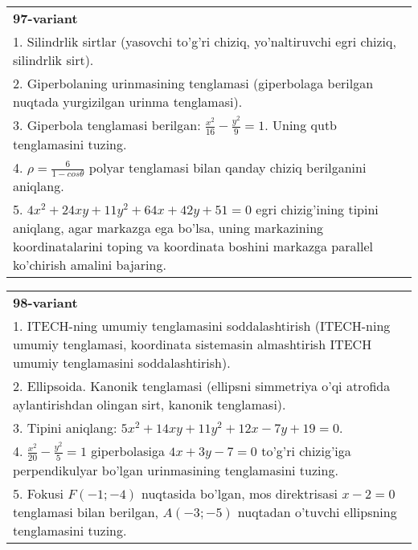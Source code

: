 \documentclass{article}
\begin{document}
\begin{tabular}{m{17cm}}
\textbf{97-variant}\\
1. Silindrlik sirtlar (yasovchi to'g'ri chiziq, yo'naltiruvchi egri chiziq, silindrlik sirt).\\

2. Giperbolaning urinmasining tenglamasi (giperbolaga berilgan nuqtada yurgizilgan urinma tenglamasi).\\

3. Giperbola tenglamasi berilgan: $\frac{x^{2}}{16}-\frac{y^{2}}{9}=1$. Uning qutb tenglamasini tuzing.\\

4. $\rho = \frac{6}{1 - cos\theta}$ polyar tenglamasi bilan qanday chiziq berilganini aniqlang.  \\

5. $4x^{2} + 24xy + 11y^{2} + 64x + 42y + 51 = 0$ egri chizig'ining tipini aniqlang, agar markazga ega bo'lsa, uning markazining koordinatalarini toping va koordinata boshini markazga parallel ko'chirish amalini bajaring.
\end{tabular}
\vspace{1cm}


\begin{tabular}{m{17cm}}
\textbf{98-variant}\\
1. ITECH-ning umumiy tenglamasini soddalashtirish (ITECH-ning umumiy tenglamasi, koordinata sistemasin almashtirish ITECH umumiy tenglamasini soddalashtirish).\\

2. Ellipsoida. Kanonik tenglamasi (ellipsni simmetriya o'qi atrofida aylantirishdan olingan sirt, kanonik tenglamasi).\\

3. Tipini aniqlang: $5x^{2}+14xy+11y^{2}+12x-7y+19=0$.\\

4. $\frac{x^{2}}{20} - \frac{y^{2}}{5} = 1$ giperbolasiga $4x + 3y - 7 = 0$ to'g'ri chizig'iga perpendikulyar bo'lgan urinmasining tenglamasini tuzing.  \\

5. Fokusi $F( - 1; - 4)$ nuqtasida bo'lgan, mos direktrisasi $x - 2 = 0$ tenglamasi bilan berilgan, $A( - 3; - 5)$ nuqtadan o'tuvchi ellipsning tenglamasini tuzing.  
\end{tabular}
\vspace{1cm}
\end{document}
